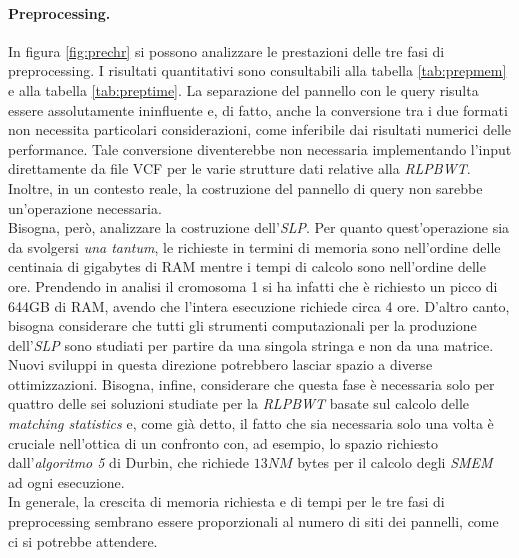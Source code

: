 \paragraph{Preprocessing.}
In figura \ref{fig:prechr} si possono analizzare le prestazioni delle tre
fasi di preprocessing. I risultati quantitativi sono consultabili alla tabella
\ref{tab:prepmem} e alla tabella \ref{tab:preptime}. La separazione del
pannello con le query risulta essere assolutamente 
ininfluente e, di fatto, anche la conversione tra i due formati non
necessita particolari considerazioni, come inferibile dai risultati numerici
delle performance. Tale conversione 
diventerebbe non necessaria implementando l'input direttamente da file VCF per
le varie strutture dati relative alla \textit{RLPBWT}. Inoltre, in un contesto
reale, la costruzione del pannello di query non sarebbe un'operazione
necessaria.\\
Bisogna, però, analizzare la costruzione 
dell'\textit{SLP}. Per quanto quest'operazione sia da svolgersi \textit{una
  tantum}, le richieste in termini di memoria sono nell'ordine delle centinaia
di gigabytes di RAM mentre i tempi di calcolo sono nell'ordine delle
ore. Prendendo in analisi il cromosoma 1 si ha infatti che è richiesto un picco
di 644GB di RAM, avendo che l'intera esecuzione richiede circa 4 ore.
D'altro canto, bisogna considerare che tutti gli strumenti computazionali per la
produzione 
dell'\textit{SLP} sono studiati per partire da una singola stringa e non da una
matrice. Nuovi sviluppi in questa direzione potrebbero lasciar spazio a diverse
ottimizzazioni. Bisogna, infine, considerare che
questa fase è necessaria solo per quattro delle sei soluzioni studiate per la
\textit{RLPBWT} basate sul calcolo delle \textit{matching statistics} e, come
già detto, il fatto che sia necessaria solo una volta 
è cruciale nell'ottica di un confronto con, ad esempio,
lo spazio richiesto dall'\textit{algoritmo 5} di Durbin, che richiede $13NM$
bytes per il calcolo degli \textit{SMEM} ad ogni esecuzione.\\
In generale, la crescita di memoria richiesta e di tempi per le tre fasi di
preprocessing sembrano essere proporzionali al numero di siti dei pannelli, come
ci si potrebbe attendere.
